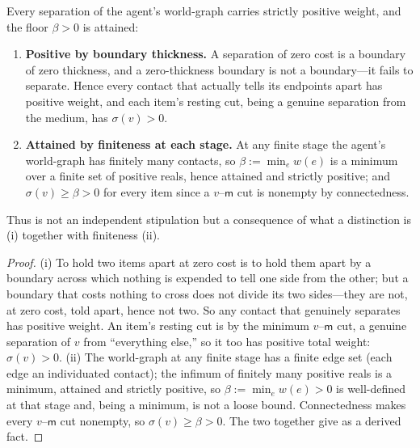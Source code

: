 \documentclass[11pt,twocolumn,a4paper]{article}
\newcommand{\wt}{w}
\newcommand{\med}{\mathsf{m}}
\newcommand{\flo}{\beta}
\newcommand{\str}{\sigma}
\begin{document}
\begin{theorem}
\label{thm:floorforced}
Every separation of the agent's world-graph carries strictly positive
weight, and the floor $\flo>0$ is attained:
\begin{enumerate}[label=\textup{(\roman*)},leftmargin=2.2em]
\item \textbf{Positive by boundary thickness.} A separation of zero cost is
a boundary of zero thickness, and a zero-thickness boundary is not a
boundary---it fails to separate. Hence every contact that actually tells its
endpoints apart has positive weight, and each item's resting cut, being a
genuine separation from the medium, has $\str(v)>0$.
\item \textbf{Attained by finiteness at each stage.} At any finite stage the
agent's world-graph has finitely many contacts, so
$\flo:=\min_{e}\wt(e)$ is a minimum over a finite set of positive reals,
hence attained and strictly positive; and $\str(v)\ge\flo>0$ for every item
since a $v$--$\med$ cut is nonempty by connectedness.
\end{enumerate}
Thus  is not an independent stipulation but a
consequence of what a distinction is (i) together with finiteness (ii).
\end{theorem}

\begin{proof}
(i) To hold two items apart at zero cost is to hold them apart by a boundary
across which nothing is expended to tell one side from the other; but a
boundary that costs nothing to cross does not divide its two sides---they are
not, at zero cost, told apart, hence not two. So any contact that genuinely
separates has positive weight. An item's resting cut is by
 the minimum $v$--$\med$ cut, a genuine separation of $v$ from
``everything else,'' so it too has positive total weight: $\str(v)>0$.
(ii) The world-graph at any finite stage has a finite edge set (each edge an
individuated contact); the infimum of finitely many positive reals is a
minimum, attained and strictly positive, so $\flo:=\min_e\wt(e)>0$ is
well-defined at that stage and, being a minimum, is not a loose bound.
Connectedness makes every $v$--$\med$ cut nonempty, so
$\str(v)\ge\flo>0$. The two together give  as a derived
fact.
\end{proof}
\end{document}
